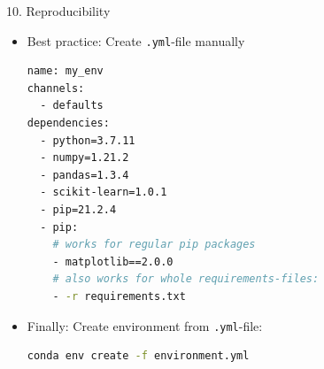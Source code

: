 \documentclass[11pt,compress,t,notes=noshow, xcolor=table]{beamer}
\begin{document}
\begin{vbframe}{10. Reproducibility}

\vfill

\begin{itemize}
	\item Best practice: Create \texttt{.yml}-file manually
		\begin{lstlisting}[language=bash]
name: my_env
channels:
  - defaults
dependencies:
  - python=3.7.11
  - numpy=1.21.2
  - pandas=1.3.4
  - scikit-learn=1.0.1
  - pip=21.2.4
  - pip:
    # works for regular pip packages
    - matplotlib==2.0.0
    # also works for whole requirements-files:
    - -r requirements.txt
		\end{lstlisting}
	\item Finally: Create environment from \texttt{.yml}-file: 
		\begin{lstlisting}[language=bash]
conda env create -f environment.yml
		\end{lstlisting}
\end{itemize}

\vfill

\end{vbframe}

\endlecture
\end{document}
